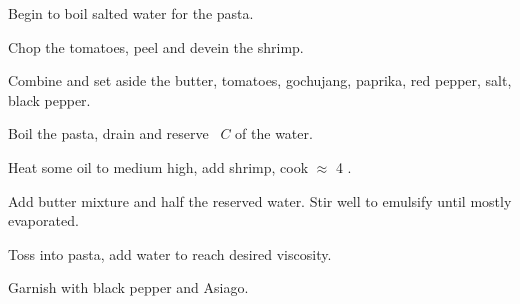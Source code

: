 \begin{preparation}
\item Begin to boil salted water for the pasta.
\item Chop the tomatoes, peel and devein the shrimp.
\item Combine and set aside the butter, tomatoes, gochujang, paprika, red pepper, salt, black pepper.
\item Boil the pasta, drain and reserve \onehalf~$C$ of the water.
\item Heat some oil to medium high, add shrimp, cook $\approx$ 4 \minute.
\item Add butter mixture and half the reserved water.
    Stir well to emulsify until mostly evaporated.
\item Toss into pasta, add water to reach desired viscosity.
\item Garnish with black pepper and Asiago.
\end{preparation}

\recipeend%
